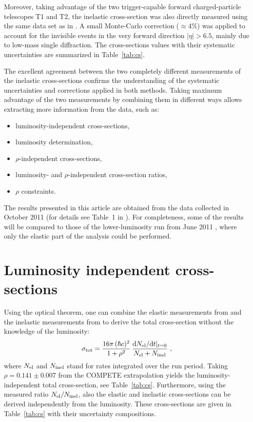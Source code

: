 \documentclass[TOTEM]{cern/cernphprep}
\def\d{{\rm d}}
\begin{document}
Moreover, taking advantage of the two trigger-capable forward charged-particle telescopes T1 and T2, the inelastic cross-section was also directly measured \cite{P2} using the same data set as in \cite{P1}. A small Monte-Carlo correction ($\approx 4\%$) was applied to account for the invisible events in the very forward direction $|\eta| > 6.5$, mainly due to low-mass single diffraction. The cross-sections values with their systematic uncertainties are summarized in Table~\ref{tab:cs}.

The excellent agreement between the two completely different measurements of the inelastic cross-sections confirms the understanding of the systematic uncertainties and corrections applied in both methods. Taking maximum advantage of the two measurements by combining them in different ways allows extracting more information from the data, such as:
\vspace*{-11pt}
\begin{itemize}
\setlength{\itemsep}{-4pt}%
\item luminosity-independent cross-sections,
\item luminosity determination,
\item $\rho$-independent cross-sections,
\item luminosity- and $\rho$-independent cross-section ratios,
\item $\rho$ constraints.
\end{itemize}
\vspace*{-4pt}
%
The results presented in this article are obtained from the data collected in October 2011 (for details see Table~1 in \cite{P1}). For completeness, some of the results will be compared to those of the lower-luminosity run from June 2011 \cite{epl96}, where only the elastic part of the analysis could be performed.


\section{Luminosity independent cross-sections}

Using the optical theorem, one can combine the elastic measurements from \cite{P1} and the inelastic measurements from \cite{P2} to derive the total cross-section without the knowledge of the luminosity:
\begin{equation}
\label{eq:m lumi indep}
	\sigma_{\rm tot} = {16\pi\, (\hbar c)^2\over 1 + \rho^2}\, {\d N_{\rm el}/\d t|_{t=0} \over N_{\rm el} + N_{\rm inel} }\ ,
\end{equation}
where $N_{\rm el}$ and $N_{\rm inel}$ stand for rates integrated over the run period. Taking $\rho = 0.141\pm 0.007$ from the COMPETE extrapolation \cite{compete} yields the luminosity-independent total cross-section, see Table~\ref{tab:cs}. Furthermore, using the measured ratio $N_{\rm el} / N_{\rm inel}$, also the elastic and inelastic cross-sections can be derived independently from the luminosity. These cross-sections are given in Table~\ref{tab:cs} with their uncertainty compositions.
\end{document}
